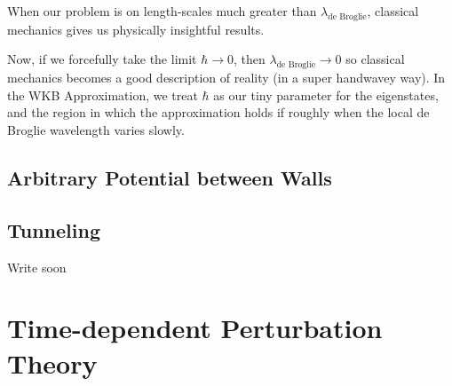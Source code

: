 \documentclass{article}
\begin{document}
When our problem is on length-scales much greater than $\lambda_{\text{de Broglie}}$, classical mechanics gives us physically insightful results. 

\vskip 0.5cm
Now, if we forcefully take the limit $\hbar \rightarrow 0$, then $\lambda_{\text{de Broglie}} \rightarrow 0$ so classical mechanics becomes a good description of reality (in a super handwavey way). In the WKB Approximation, we treat $\hbar$ as our tiny parameter for the eigenstates, and the region in which the approximation holds if roughly when the local de Broglie wavelength varies slowly.

\vskip 0.5cm
\subsection{Arbitrary Potential between Walls}

\vskip 0.5cm
\subsection{Tunneling}
Write soon



\pagebreak

\section{Time-dependent Perturbation Theory}






\end{document}
